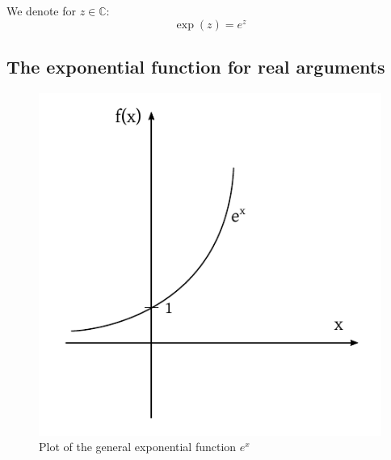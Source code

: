 \documentclass[a4paper,landscape,twocolumn]{article}
\theoremstyle{definition}
\begin{document}
We denote for $z \in \mathbb C$:
\[ \exp(z) = e^z \]

\subsection{The exponential function for real arguments}

\begin{figure}[!h]
  \begin{center}
    \includegraphics{img/exponential_function.pdf}
    \caption{Plot of the general exponential function $e^x$}
    \label{img:exp}
  \end{center}
\end{figure}
\end{document}
